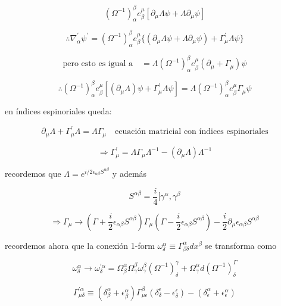 \documentclass{report}
\begin{document}
{\[(\Omega^{-1})_{\alpha}^{\beta}e_{\beta}^{\mu} [\partial_{\mu} \Lambda \psi + \Lambda \partial _{\mu} \psi] \]

\begin{equation}
\therefore \nabla_{\alpha}^{\prime} \psi^{\prime} = (\Omega^{-1})_{\alpha}^{\beta} e_{\beta}^{\mu} \lbrace (\partial_{\mu} \Lambda \psi + \Lambda \partial_{\mu} \psi) + \Gamma_{\mu}^{\prime} \Lambda \psi \rbrace
\end{equation}

\[\text{pero esto es igual a} \quad = \Lambda (\Omega^{-1})_{\alpha}^{\beta} e_{\beta}^{\mu} (\partial_{\mu} + \Gamma_{\mu}) \psi\]

\begin{equation}
\therefore (\Omega^{-1})_{\alpha}^{\beta} e_{\beta}^{\mu} [(\partial_{\mu} \Lambda ) \psi + \Gamma _{\mu}^{\prime} \Lambda \psi ] = \Lambda(\Omega^{-1})_{\alpha}^{\beta} e_{\beta}^{\mu} \Gamma_{\mu} \psi
\end{equation}

en índices espinoriales queda:

\[\partial_{\mu} \Lambda + \Gamma_{\mu}^{\prime} \Lambda = \Lambda \Gamma_{\mu} \quad \text{ecuación matricial con índices espinoriales}\]

\begin{equation}
\Rightarrow \Gamma_{\mu}^{\prime} = \Lambda \Gamma_{\mu} \Lambda^{-1} - (\partial_{\mu} \Lambda) \Lambda^{-1}
\end{equation}

recordemos que $\Lambda = e^{i/2 \epsilon_{\alpha \beta} S^{\alpha \beta}}$ y además

\[S^{\alpha \beta} = \frac{i}{4} [\gamma^{\alpha} , \gamma^{\beta}\]

\[\Rightarrow \Gamma_{\mu} \rightarrow (\Gamma + \frac{i}{2} \epsilon_{\alpha \beta} S^{\alpha \beta}) \Gamma_{\mu} (\Gamma- \frac{i}{2} \epsilon_{\alpha \beta} S^{\alpha \beta }) - \frac{i}{2} \partial _{\mu} \epsilon_{\alpha \beta} S^{\alpha \beta}\]

recordemos ahora que la conexión 1-form $\omega_{\delta}^{\alpha} \equiv \Gamma_{\beta \delta}^{\alpha} dx^{\beta}$ se transforma como

\[\omega_{\delta}^{\alpha} \rightarrow \omega_{\delta}^{\prime \alpha} = \Omega_{\beta}^{\alpha} \Omega_{\gamma}^{\beta} \omega_{\gamma}^{\beta} (\Omega^{-1})_{\delta}^{\gamma} + \Omega_{\gamma}^{\alpha} d(\Omega^{-1})_{\delta}^{\Gamma}\]

\[\Gamma_{\mu \delta}^{\prime \alpha} \equiv (\delta_{\beta}^{\alpha} + \epsilon_{\beta}^{\alpha}) \Gamma_{\mu \epsilon}^{\beta} (\delta_{\delta}^{\epsilon} - \epsilon_{\delta}^{\epsilon}) - (\delta_{\epsilon}^{\alpha} + \epsilon_{\epsilon}^{\alpha} )\]

}
\end{document}
